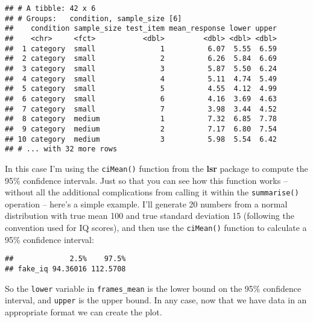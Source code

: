 \documentclass[]{book}
\newenvironment{Shaded}{\begin{snugshade}}{\end{snugshade}}
\newcommand{\CommentTok}[1]{\textcolor[rgb]{0.56,0.35,0.01}{\textit{#1}}}
\newcommand{\DataTypeTok}[1]{\textcolor[rgb]{0.13,0.29,0.53}{#1}}
\newcommand{\DecValTok}[1]{\textcolor[rgb]{0.00,0.00,0.81}{#1}}
\newcommand{\KeywordTok}[1]{\textcolor[rgb]{0.13,0.29,0.53}{\textbf{#1}}}
\newcommand{\NormalTok}[1]{#1}
\newcommand{\OperatorTok}[1]{\textcolor[rgb]{0.81,0.36,0.00}{\textbf{#1}}}
\newcommand{\StringTok}[1]{\textcolor[rgb]{0.31,0.60,0.02}{#1}}
\begin{document}
\begin{verbatim}
## # A tibble: 42 x 6
## # Groups:   condition, sample_size [6]
##    condition sample_size test_item mean_response lower upper
##    <chr>     <fct>           <dbl>         <dbl> <dbl> <dbl>
##  1 category  small               1          6.07  5.55  6.59
##  2 category  small               2          6.26  5.84  6.69
##  3 category  small               3          5.87  5.50  6.24
##  4 category  small               4          5.11  4.74  5.49
##  5 category  small               5          4.55  4.12  4.99
##  6 category  small               6          4.16  3.69  4.63
##  7 category  small               7          3.98  3.44  4.52
##  8 category  medium              1          7.32  6.85  7.78
##  9 category  medium              2          7.17  6.80  7.54
## 10 category  medium              3          5.98  5.54  6.42
## # ... with 32 more rows
\end{verbatim}

In this case I'm using the \texttt{ciMean()} function from the \textbf{lsr} package to compute the 95\% confidence intervals. Just so that you can see how this function works -- without all the additional complications from calling it within the \texttt{summarise()} operation -- here's a simple example. I'll generate 20 numbers from a normal distribution with true mean 100 and true standard deviation 15 (following the convention used for IQ scores), and then use the \texttt{ciMean()} function to calculate a 95\% confidence interval:

\begin{Shaded}
\end{Shaded}

\begin{verbatim}
##             2.5%    97.5%
## fake_iq 94.36016 112.5708
\end{verbatim}

So the \texttt{lower} variable in \texttt{frames\_mean} is the lower bound on the 95\% confidence interval, and \texttt{upper} is the upper bound. In any case, now that we have data in an appropriate format we can create the plot.
\end{document}
